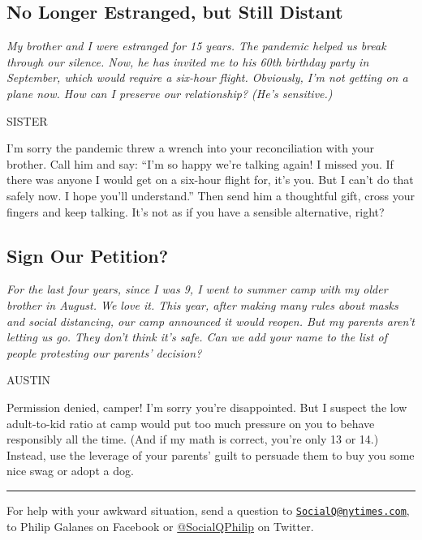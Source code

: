 \hypertarget{no-longer-estranged-but-still-distant}{%
\subsection{No Longer Estranged, but Still
Distant}\label{no-longer-estranged-but-still-distant}}

\emph{My brother and I were estranged for 15 years. The pandemic helped
us break through our silence. Now, he has invited me to his 60th
birthday party in September, which would require a six-hour flight.
Obviously, I'm not getting on a plane now. How can I preserve our
relationship? (He's sensitive.)}

SISTER

I'm sorry the pandemic threw a wrench into your reconciliation with your
brother. Call him and say: ``I'm so happy we're talking again! I missed
you. If there was anyone I would get on a six-hour flight for, it's you.
But I can't do that safely now. I hope you'll understand.'' Then send
him a thoughtful gift, cross your fingers and keep talking. It's not as
if you have a sensible alternative, right?

\hypertarget{sign-our-petition}{%
\subsection{Sign Our Petition?}\label{sign-our-petition}}

\emph{For the last four years, since I was 9, I went to summer camp with
my older brother in August. We love it. This year, after making many
rules about masks and social distancing, our camp announced it would
reopen. But my parents aren't letting us go. They don't think it's safe.
Can we add your name to the list of people protesting our parents'
decision?}

AUSTIN

Permission denied, camper! I'm sorry you're disappointed. But I suspect
the low adult-to-kid ratio at camp would put too much pressure on you to
behave responsibly all the time. (And if my math is correct, you're only
13 or 14.) Instead, use the leverage of your parents' guilt to persuade
them to buy you some nice swag or adopt a dog.

\begin{center}\rule{0.5\linewidth}{\linethickness}\end{center}

For help with your awkward situation, send a question to
\href{mailto:SocialQ@nytimes.com}{\nolinkurl{SocialQ@nytimes.com}}, to
Philip Galanes on Facebook or
\href{https://twitter.com/SocialQPhilip}{@SocialQPhilip} on Twitter.

